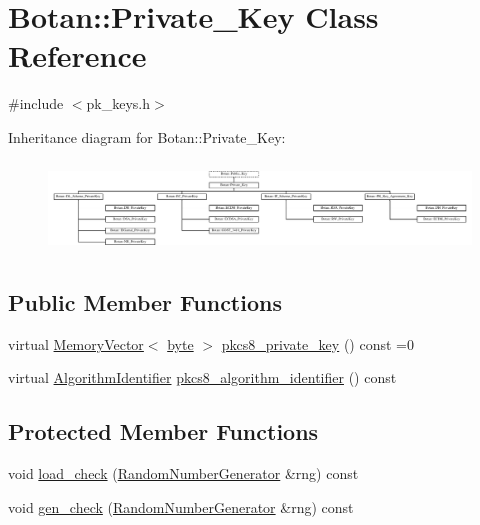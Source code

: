 \hypertarget{classBotan_1_1Private__Key}{\section{Botan\-:\-:Private\-\_\-\-Key Class Reference}
\label{classBotan_1_1Private__Key}
}


{\ttfamily \#include $<$pk\-\_\-keys.\-h$>$}

Inheritance diagram for Botan\-:\-:Private\-\_\-\-Key\-:\begin{figure}[H]
\begin{center}
\leavevmode
\includegraphics[height=2.450000cm]{classBotan_1_1Private__Key}
\end{center}
\end{figure}
\subsection*{Public Member Functions}
\begin{DoxyCompactItemize}
\item 
virtual \hyperlink{classBotan_1_1MemoryVector}{Memory\-Vector}$<$ \hyperlink{namespaceBotan_a7d793989d801281df48c6b19616b8b84}{byte} $>$ \hyperlink{classBotan_1_1Private__Key_a26c97282f9c3b32c024dafb77b35cb1e}{pkcs8\-\_\-private\-\_\-key} () const =0
\item 
virtual \hyperlink{classBotan_1_1AlgorithmIdentifier}{Algorithm\-Identifier} \hyperlink{classBotan_1_1Private__Key_a6fdc1518f755798eda8318a8957f3485}{pkcs8\-\_\-algorithm\-\_\-identifier} () const 
\end{DoxyCompactItemize}
\subsection*{Protected Member Functions}
\begin{DoxyCompactItemize}
\item 
void \hyperlink{classBotan_1_1Private__Key_a9e5c96cc5576a45479cf75c400009ceb}{load\-\_\-check} (\hyperlink{classBotan_1_1RandomNumberGenerator}{Random\-Number\-Generator} \&rng) const 
\item 
void \hyperlink{classBotan_1_1Private__Key_a1125c65bccbbaa71eb46db5d1d3c1d7b}{gen\-\_\-check} (\hyperlink{classBotan_1_1RandomNumberGenerator}{Random\-Number\-Generator} \&rng) const 
\end{DoxyCompactItemize}


